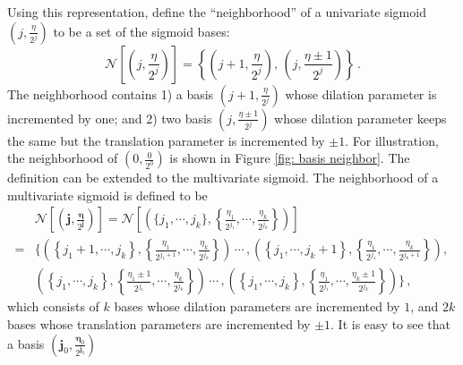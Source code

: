 Using this representation, define the ``neighborhood'' of a univariate sigmoid 
$(j,\frac{\eta}{2^j})$ to be a set of the sigmoid bases:
\begin{equation}
    \mathcal{N}\left[ \left(j,\frac{\eta}{2^j}\right) \right]
    = \left\{ 
        \left( j+1, \frac{\eta}{2^j} \right),\,
        \left( j, \frac{\eta\pm 1}{2^j} \right)
    \right\}\,.
    \label{eqn: neighborhood 1D}
\end{equation}
The neighborhood contains 1) a basis 
$\left( j+1, \frac{\eta}{2^j} \right)$ 
whose dilation parameter is incremented by one; and
2) two basis $\left( j, \frac{\eta\pm 1}{2^j} \right)$
whose dilation parameter keeps the same but the translation parameter is incremented by $\pm 1$.
For illustration, the neighborhood of $\left(0,\frac{0}{2^0}\right)$
is shown in Figure \ref{fig: basis neighbor}.
The definition can be extended to the multivariate sigmoid. 
The neighborhood of a multivariate sigmoid is defined to be
\begin{equation}\begin{split}
    &\mathcal{N}
    \left[
         \left(
               \boldsymbol{j}, \frac{\boldsymbol{\eta}}{2^{\boldsymbol{j}}}
         \right)
    \right] = 
    \mathcal{N}\left[ \left(\{j_1, \cdots, j_k\} , \left\{
    \frac{\eta_1}{2^{j_1}}, \cdots, \frac{\eta_k}{2^{j_k}} \right\} \right) \right]\\
    = & \bigg\{
            \left( \left\{ j_1+1,\cdots, j_k\right\},
                   \left\{ \frac{\eta_1}{2^{j_1+1}}, \cdots, \frac{\eta_k}{2^{j_k}} \right\}
            \right) \, \cdots \, ,
            \left( \left\{ j_1,\cdots, j_k+1\right\},
                   \left\{ \frac{\eta_1}{2^{j_1}}, \cdots, \frac{\eta_k}{2^{j_k+1}} \right\}
            \right),\,   \\
          & 
            \left( \left\{ j_1,\cdots, j_k\right\},
                   \left\{ \frac{\eta_1\pm 1}{2^{j_1}}, \cdots, \frac{\eta_k}{2^{j_k}} \right\}
            \right) \, \cdots \, ,
            \left( \left\{ j_1,\cdots, j_k\right\},
                   \left\{ \frac{\eta_1}{2^{j_1}}, \cdots, \frac{\eta_k\pm 1}{2^{j_k}} \right\}
            \right) \bigg\}\,,
    \label{eqn: neighborhood kD}
\end{split}\end{equation}
which consists of $k$ bases whose dilation parameters are incremented by $1$, 
and $2k$ bases whose translation parameters are incremented by $\pm 1$.
It is easy to see that a basis $(\boldsymbol{j}_0, \frac{\boldsymbol{\eta}_0}{2^{\boldsymbol{j}_0}})$ 
